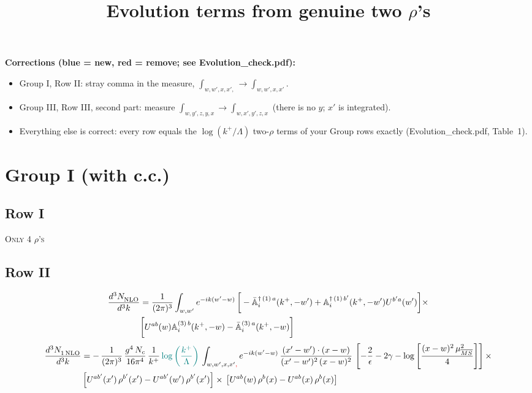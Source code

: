 \documentclass[9pt]{article}
\title{Evolution terms from genuine two $\rho$'s}
\author{}
\date{}
\def\mf#1{\mathbb{#1}}
\numberwithin{equation}{section}
\begin{document}
\maketitle
{\color{blue}\noindent\textbf{Corrections (blue = new, red = remove; see Evolution\_check.pdf):}
\begin{itemize}
\item Group I, Row II: stray comma in the measure, $\int_{w,w',x,x',}\to\int_{w,w',x,x'}$.
\item Group III, Row III, second part: measure $\int_{w,y',z,y,x}\to\int_{w,x',y',z,x}$ (there is no $y$; $x'$ is integrated).
\item Everything else is correct: every row equals the $\log(k^+/\Lambda)$ two-$\rho$ terms of your Group rows exactly (Evolution\_check.pdf, Table~1).
\end{itemize}}

\section{Group I (with c.c.)}
\subsection{Row I}
\textsc{Only 4 $\rho$'s}
\subsection{Row II}
\begin{align}
    \frac{d^{3}N_{\rm NLO}^{\rm}}{d^{3}k} &  = \frac{1}{(2\pi)^{3}}  \int_{w, w^\prime} e^{-ik(w^\prime-w)}\,\bigg[-\bar{\mf{A}}^{\dagger\,(1)\,a}_{i}(k^{+},-w^{\prime})+\mf{A}^{\dagger\, (1)\, b^{\prime}}_{i}(k^{+},-w^{\prime})U^{b^{\prime}a}(w^{\prime})\bigg]\times \notag \\ & \bigg[U^{ab}(w)\mf{A}^{(3)\, b}_{i}(k^{+},- w)-\Bar{\mf{A}}^{(3)\, a}_{i}(k^{+}, - w)\bigg]\nonumber
\end{align}
\begin{align}
     \frac{d^{3}N_{1\,\rm NLO}^{\rm}}{d^{3}k} &  = -\,\frac{1}{(2\pi)^{3}}\, \frac{g^{4}\,N_{c}}{16\pi^{4}}\,\frac{1}{k^{+}}\,{\color{teal}\log{\left(\frac{k^{+}}{\Lambda}\right)}}\, \int_{w, w',x,x'{\color{red},}} e^{-ik(w^\prime-w)}\, \frac{(x'-w')\cdot (x-w)}{(x'-w')^{2}\, (x-w)^{2}}\, \left[-\frac{2}{\epsilon}-2\gamma-\log{\left[\frac{(x-w)^{2}\,\mu^{2}_{\overline{MS}}}{4}\right]}\right]\times\notag \\ & \left[U^{ab'}(x')\,\rho^{b'}(x') - U^{ab'}(w')\,\rho^{b'}(x')\right]\times\,\left[U^{ab}(w)\,\rho^{b}(x) - U^{ab}(x)\,\rho^{b}(x)\right]
\end{align}
\end{document}
